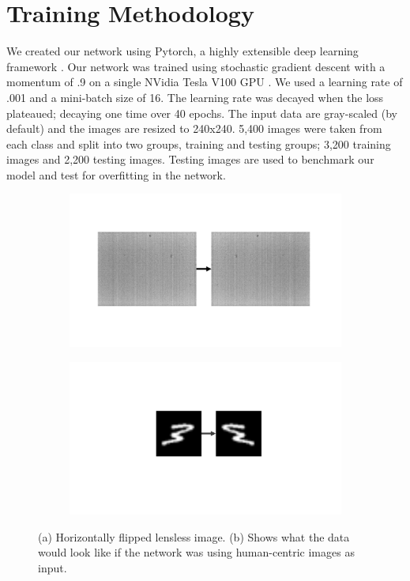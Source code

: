 \documentclass{osa-article}
\begin{document}
\section{Training Methodology}
We created our network using Pytorch, a highly extensible deep learning framework \cite{paszke2017automatic}. Our network was trained using stochastic gradient descent with a momentum of .9 on a single NVidia Tesla V100 GPU \cite{DBLP:journals/corr/KingmaB14, Sutskever:2013:IIM:3042817.3043064}. We used a learning rate of .001 and a mini-batch size of 16. The learning rate was decayed when the loss plateaued; decaying one time over 40 epochs. The input data are gray-scaled (by default) and the images are resized to 240x240. 5,400 images were taken from each class and split into two groups, training and testing groups; 3,200 training images and 2,200 testing images. Testing images are used to benchmark our model and test for overfitting in the network.
%
\begin{figure}[!ht]
\centering
\begin{subfigure}[b]{0.45\textwidth}
   \includegraphics[width=1\linewidth]{lensless_hflip}
   \caption{}
   \label{fig:Ng1} 
\end{subfigure}\hfill
\begin{subfigure}[b]{0.45\textwidth}
   \includegraphics[width=1\linewidth]{lensed_hflip}
   \caption{}
   \label{flipping}
\end{subfigure}
\caption{(a) Horizontally flipped lensless image. (b) Shows what the data would look like if the network was using human-centric images as input.}\label{data_augmentations}
\end{figure}
%
\end{document}
